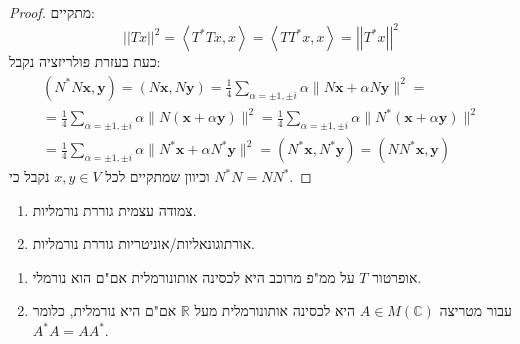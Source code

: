 \documentclass{tstextbook}
\begin{document}
\begin{proof}
מתקיים:
$$\left\vert\left\vert T x\right\vert\right\vert^{2}=\left\langle T^{*}T x,x\right\rangle=\left\langle T T^{*}x,x\right\rangle=\left\vert\left\vert T^{*}x\right\vert\right\vert^{2}$$
כעת בעזרת פולריזציה נקבל:
$$\begin{gather}\left( N^{*}N\mathbf{x},\mathbf{y} \right)=\left( N\mathbf{x},N\mathbf{y} \right)=\frac{1}{4}\sum_{\alpha=\pm1,\pm i}\alpha\|N\mathbf{x}+\alpha N\mathbf{y}\|^{2}=\\=\frac{1}{4}\sum_{\alpha=\pm1,\pm i}\alpha\|N\left( \mathbf{x}+\alpha\mathbf{y} \right)\|^{2}=\frac{1}{4}\sum_{\alpha=\pm1,\pm i}\alpha\|N^{*}\left( \mathbf{x}+\alpha\mathbf{y} \right)\|^{2}\\=\frac{1}{4}\sum_{\alpha=\pm1,\pm i}\alpha\|N^{*}\mathbf{x}+\alpha N^{*}\mathbf{y}\|^{2}=\left( N^{*}\mathbf{x},N^{*}\mathbf{y} \right)=\left( NN^{*}\mathbf{x},\mathbf{y} \right) 
\end{gather}$$
וכיוון שמתקיים לכל \(x,y \in V\) נקבל כי \(N^{*}N=N N^{*}\).

\end{proof}
\begin{proposition}
  \begin{enumerate}
    \item צמודה עצמית גוררת נורמליות. 


    \item אורתוגונאליות/אוניטריות גוררת נורמליות. 


  \end{enumerate}
\end{proposition}
\begin{theorem}
  \begin{enumerate}
    \item אופרטור \(T\) על ממ"פ מרוכב היא לכסינה אותונורמלית אם"ם הוא נורמלי. 


    \item עבור מטריצה \(A\in M(\mathbb C)\) היא לכסינה אותונורמלית מעל \(\mathbb R\) אם"ם היא נורמלית, כלומר \(A^* A = A A^*\). 


  \end{enumerate}
\end{theorem}
\end{document}
